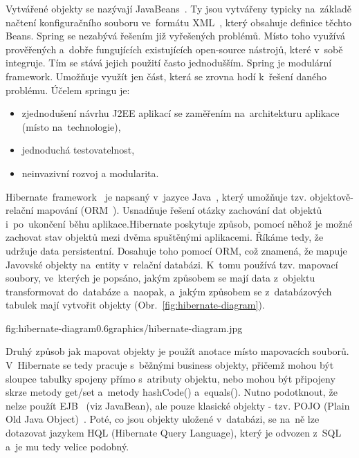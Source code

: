Vytvářené objekty se nazývají JavaBeans~\cite{java-beans}. Ty jsou vytvářeny typicky na~základě načtení konfiguračního souboru ve~formátu XML~\cite{xml}, který obsahuje definice těchto Beans. Spring se nezabývá řešením již vyřešených problémů. Místo toho využívá prověřených a~dobře fungujících existujících open-source nástrojů, které v~sobě integruje. Tím se stává jejich použití často jednodušším. Spring je modulární framework. Umožňuje využít jen část, která se zrovna hodí k~řešení daného problému. Účelem springu je:
\begin{itemize}
	\setlength{\parskip}{0pt}
	\setlength{\itemsep}{0pt}
	\item {zjednodušení návrhu J2EE aplikací se zaměřením na~architekturu aplikace (místo na~technologie),}
	\item {jednoduchá testovatelnost,}
	\item {neinvazivní rozvoj a modularita.}
\end{itemize}

Hibernate~framework~\cite{hibernate-framework} je napsaný v~jazyce Java~\cite{java}, který umožňuje tzv. objektově-relační mapování (ORM~\cite{orm}). Usnadňuje řešení otázky zachování dat objektů i~po~ukončení běhu aplikace.Hibernate poskytuje způsob, pomocí něhož je možné zachovat stav objektů mezi dvěma spuštěnými aplikacemi. Říkáme tedy, že udržuje data persistentní. Dosahuje toho pomocí ORM, což znamená, že mapuje Javovské objekty na~entity v~relační databázi. K~tomu používá tzv. mapovací soubory, ve~kterých je popsáno, jakým způsobem se mají data z~objektu transformovat do~databáze a~naopak, a~jakým způsobem se z~databázových tabulek mají vytvořit objekty (Obr.~\ref{fig:hibernate-diagram}).

 {fig:hibernate-diagram}{0.6}{graphics/hibernate-diagram.jpg}

Druhý způsob jak mapovat objekty je použít anotace místo mapovacích souborů. V~Hibernate se tedy pracuje s~běžnými business objekty, přičemž mohou být sloupce tabulky spojeny přímo s~atributy objektu, nebo mohou být připojeny skrze metody get/set a~metody hashCode() a~equals(). Nutno podotknout, že nelze použít EJB~\cite{enterprise-javabeans} (viz JavaBean), ale pouze klasické objekty - tzv. POJO (Plain Old Java Object)~\cite{pojo}. Poté, co jsou objekty uložené v~databázi, se na~ně lze dotazovat jazykem HQL (Hibernate Query Language), který je odvozen z~SQL~\cite{sql} a~je mu tedy velice podobný.

